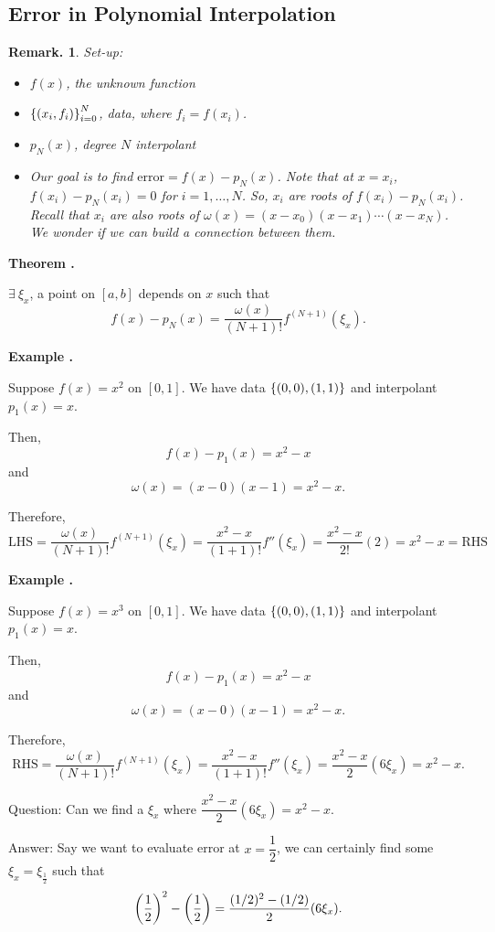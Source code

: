 \documentclass[12pt, a4paper]{article}
\newcounter{index}[subsection]
\newenvironment*{eg}[1]{\begin{framed}\par\noindent\textbf{Example \thesubsection.\stepcounter{index}\theindex\ #1} \par}{\par\end{framed}}
\newenvironment*{thm}[1]{\begin{tcolorbox}\par\noindent\textbf{Theorem \thesubsection.\stepcounter{index}\theindex\ #1} \par}{\par\end{tcolorbox}}
\newtheorem{rmk}{Remark.}[section]
\begin{document}
\subsection{Error in Polynomial Interpolation}
\begin{rmk} Set-up:
	\begin{itemize}
		\item $f(x)$, the unknown function
		\item $\qty{(x_i,f_i)}_{i=0}^N$, data, where $f_i=f(x_i)$.
		\item $p_N(x)$, degree $N$ interpolant
		\item Our goal is to find $\mathrm{error}=f(x)-p_N(x)$. Note that at $x=x_i$, $f(x_i)-p_N(x_i)=0$ for $i=1,\dots,N$. So, $x_i$ are roots of $f(x_i)-p_N(x_i)$. Recall that $x_i$ are also roots of $\omega(x)=(x-x_0)(x-x_1)\cdots(x-x_N)$. We wonder if we can build a connection between them.
	\end{itemize}	
\end{rmk}
\begin{thm}{}
	$\exists\ \xi_x$, a point on $[a,b]$ depends on $x$ such that \[f(x)-p_N(x)=\dfrac{\omega(x)}{(N+1)!}f^{(N+1)}(\xi_x).\]
\end{thm}
\begin{eg}{}
	Suppose $f(x)=x^2$ on $[0,1]$. We have data $\qty{(0,0), (1,1)}$ and interpolant $p_1(x)=x$.\par  Then, \[f(x)-p_1(x)=x^2-x\] and \[\omega(x)=(x-0)(x-1)=x^2-x.\]\par Therefore, \[\text{LHS}=\dfrac{\omega(x)}{(N+1)!}f^{(N+1)}(\xi_x)=\dfrac{x^2-x}{(1+1)!}f''(\xi_x)=\dfrac{x^2-x}{2!}(2)=x^2-x=\text{RHS}\]
\end{eg}
\begin{eg}{}
	Suppose $f(x)=x^3$ on $[0,1]$. We have data $\qty{(0,0), (1,1)}$ and interpolant $p_1(x)=x$.\par Then, \[f(x)-p_1(x)=x^2-x\] and \[\omega(x)=(x-0)(x-1)=x^2-x.\]\par Therefore, \[\text{RHS}=\dfrac{\omega(x)}{(N+1)!}f^{(N+1)}(\xi_x)=\dfrac{x^2-x}{(1+1)!}f''(\xi_x)=\dfrac{x^2-x}{2}(6\xi_x)=x^2-x.\]\par Question: Can we find a $\xi_x$ where $\dfrac{x^2-x}{2}(6\xi_x)=x^2-x$.\par Answer: Say we want to evaluate error at $x=\dfrac{1}{2}$, we can certainly find some $\xi_x=\xi_\frac{1}{2}$ such that \[\qty(\dfrac{1}{2})^2-\qty(\dfrac{1}{2})=\dfrac{(1/2)^2-(1/2)}{2}(6\xi_x).\]
\end{eg}
\end{document}
